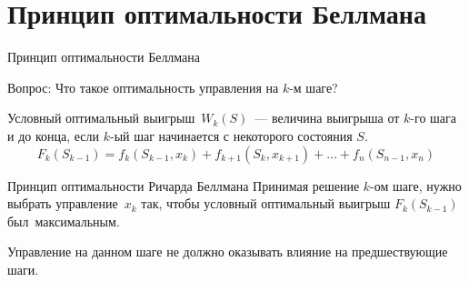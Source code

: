\documentclass[unicode,11pt,notheorems,xcolor=table]{beamer}
\begin{document}
\section{Принцип оптимальности Беллмана}

\begin{frame}{Принцип оптимальности Беллмана}
%

\begin{alertblock}{Вопрос:}
 Что такое оптимальность управления на $k$-м  шаге?
\end{alertblock}
	
\bigskip
    \alert{Условный оптимальный выигрыш~$W_k(S)$}~--- величина выигрыша от $k$-го шага и до конца, если $k$-ый шаг начинается с некоторого состояния $S$.
	$$
		F_k(S_{k-1})
		= f_{k}(S_{k-1},x_{k})+f_{k+1}(S_{k},x_{k+1})+\ldots+ f_n(S_{n-1},x_n)
	$$
	
       
	\begin{block}{Принцип оптимальности Ричарда Беллмана} 
		Принимая решение $k$-ом шаге, нужно выбрать управление~$x_k$ так, чтобы условный оптимальный выигрыш $F_k(S_{k-1})$ был~максимальным. 
	\end{block}

\alert{Управление на данном шаге не должно оказывать влияние на предшествующие шаги.}

\end{frame}

%
%
%
%
\end{document}
